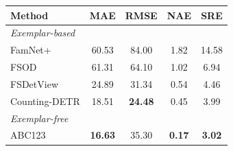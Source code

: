 \begin{tabular}{lcccc}
 \toprule
Method&MAE&RMSE&NAE&SRE\\
\midrule
\multicolumn{5}{l}{\textit{Exemplar-based}}\\
FamNet+&60.53&84.00&1.82&14.58\\
FSOD &61.31&64.10&1.02&6.94\\
FSDetView \cite{xiao2022few} &24.89&31.34&0.54&4.46\\
Counting-DETR &18.51&\textbf{24.48}&0.45&3.99\\
\midrule
\multicolumn{5}{l}{\textit{Exemplar-free}} \\
ABC123 & \textbf{16.63} & 35.30 & \textbf{0.17} & \textbf{3.02}\\
\bottomrule
\end{tabular}